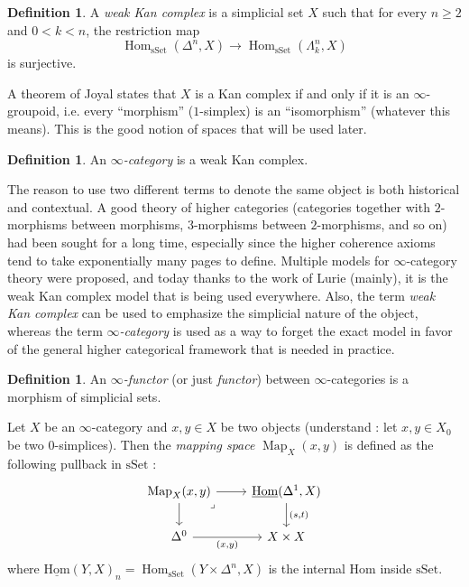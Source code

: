\documentclass[11pt]{article}
\theoremstyle{definition}
\newtheorem{definition}[theorem]{Definition}
\newcommand{\Hom}{\operatorname{Hom}}
\newcommand{\iHom}{\operatorname{\underline{Hom}}}
\newcommand{\Map}{\operatorname{Map}}
\newcommand{\sSet}{\mathrm{sSet}}
\begin{document}
\begin{definition}
    A \emph{weak Kan complex} is a simplicial set $X$ such that for every $n \geq 2$ and $0 < k < n$, the restriction map
    \[
        \Hom_{\sSet}(\Delta^n, X) \to \Hom_{\sSet}(\Lambda_k^n, X)
    \]
    is surjective.
\end{definition}

A theorem of Joyal states that $X$ is a Kan complex if and only if it is an $\infty$-groupoid, i.e. every \enquote{morphism} ($1$-simplex) is an \enquote{isomorphism} (whatever this means).
This is the good notion of spaces that will be used later.

\begin{definition}
    An \emph{$\infty$-category} is a weak Kan complex.
\end{definition}

The reason to use two different terms to denote the same object is both historical and contextual.
A good theory of higher categories (categories together with $2$-morphisms between morphisms, $3$-morphisms between $2$-morphisms, and so on) had been sought for a long time, especially since the higher coherence axioms tend to take exponentially many pages to define.
Multiple models for $\infty$-category theory were proposed, and today thanks to the work of Lurie (mainly), it is the weak Kan complex model that is being used everywhere.
Also, the term \emph{weak Kan complex} can be used to emphasize the simplicial nature of the object, whereas the term \emph{$\infty$-category} is used as a way to forget the exact model in favor of the general higher categorical framework that is needed in practice.

\begin{definition}
    An \emph{$\infty$-functor} (or just \emph{functor}) between $\infty$-categories is a morphism of simplicial sets.
\end{definition}

Let $X$ be an $\infty$-category and $x, y \in X$ be two objects (understand : let $x, y \in X_0$ be two $0$-simplices).
Then the \emph{mapping space} $\Map_X(x, y)$ is defined as the following pullback in $\sSet$ :
\[\begin{tikzcd}
	{\Map_X(x, y)} & {\iHom(\Delta^1, X)} \\
	{\Delta^0} & {X\times X}
	\arrow[from=1-1, to=1-2]
	\arrow[from=1-1, to=2-1]
	\arrow["\lrcorner"{anchor=center, pos=0.125}, draw=none, from=1-1, to=2-2]
	\arrow["{(s, t)}", from=1-2, to=2-2]
	\arrow["{(x, y)}"', from=2-1, to=2-2]
\end{tikzcd}\]
where $\iHom(Y, X)_n = \Hom_{\sSet}(Y \times \Delta^n, X)$ is the internal Hom inside $\sSet$.
\end{document}

